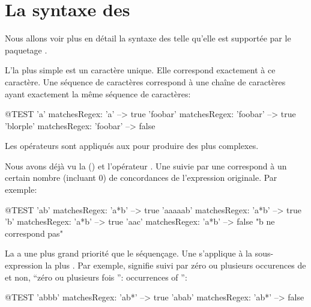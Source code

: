 \documentclass[a4paper,10pt,twoside]{book}
\begin{document}
\section{La syntaxe des \expregs}

Nous allons voir plus en détail la syntaxe des \expreg telle qu'elle
est supportée par le paquetage \pkgregex.

L'\expreg la plus simple est un caractère unique. Elle correspond
exactement à ce caractère. Une séquence de caractères correspond à une
chaîne de caractères ayant exactement la même séquence de caractères:
\begin{code}{@TEST}
'a' matchesRegex: 'a'                  --> true
'foobar' matchesRegex: 'foobar'  --> true
'blorple' matchesRegex: 'foobar' --> false
\end{code}

Les opérateurs sont appliqués aux \expregs pour produire des \expregs
plus complexes.

Nous avons déjà vu la \ind{\kleenestar} (\ct{*}) et l'opérateur \ct{+}.
Une \expreg suivie par une \kleenestar correspond à un certain nombre
(incluant $0$) de concordances de l'expression originale. Par exemple:
\begin{code}{@TEST}
'ab' matchesRegex: 'a*b'         --> true
'aaaaab' matchesRegex: 'a*b' --> true
'b' matchesRegex: 'a*b'           --> true
'aac' matchesRegex: 'a*b'	    --> false    "b ne correspond pas"
\end{code}

La \kleenestar a une plus grand priorité que le séquençage. Une
\kleenestar s'applique à la sous-expression la plus 
.
Par exemple,  signifie  suivi par zéro ou plusieurs
occurences de  et non, ``zéro ou plusieurs fois '':
occurrences of '':
\begin{code}{@TEST}
'abbb' matchesRegex: 'ab*' --> true
'abab' matchesRegex: 'ab*' --> false
\end{code}
\end{document}
